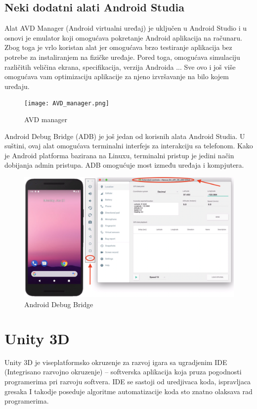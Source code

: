 \documentclass[12pt]{article}
\begin{document}
\subsection{Neki dodatni alati Android Studia}
Alat AVD Manager (Android virtualni uređaj) je uključen u Android Studio i u osnovi je emulator koji omogućava pokretanje Android aplikacija na računaru. Zbog toga je vrlo koristan alat jer omogućava brzo testiranje aplikacija bez potrebe za instaliranjem na fizičke uređaje. Pored toga, omogućava simulaciju različitih veličina ekrana, specifikacija, verzija Androida ... Sve ovo i još više omogućava vam optimizaciju aplikacije za njeno izvršavanje na bilo kojem uređaju.

\begin{figure}[ht!]
    \centering
    \texttt{[image: AVD\_manager.png]}
    \caption{AVD manager}
\end{figure}

Android Debug Bridge (ADB) je još jedan od korisnih alata Android Studia. U suštini, ovaj alat omogućava terminalni interfejs za interakciju sa telefonom. Kako je Android platforma bazirana na Linuxu, terminalni pristup je jedini način dobijanja admin pristupa. ADB omogućuje most između uređaja i kompjutera.

\begin{figure}[ht!]
    \centering
    \includegraphics[scale=0.1]{adb.png}
    \caption{Android Debug Bridge}
\end{figure}


\section{Unity 3D}

Unity 3D je viseplatformsko okruzenje za razvoj igara sa ugradjenim IDE (Integrisano razvojno okruzenje) – softverska aplikacija koja pruza pogodnosti programerima pri razvoju softvera. IDE se sastoji od uredjivaca koda, ispravljaca gresaka I takodje poseduje algoritme automatizacije koda sto 
znatno olaksava rad programerima.
\end{document}
